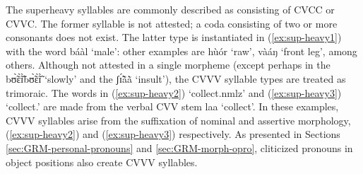The superheavy syllables are commonly described as consisting of CVCC or CVVC.
The former syllable is not attested; a coda consisting of two or more consonants
does not exist. The latter type is instantiated in (\ref{ex:sup-heavy1}) with
 the word {\sls báàl} `male':  other examples are {\sls hùór} `raw',  
{\sls vàáŋ} `front leg', among others.  Although not attested in a single
morpheme (except perhaps in the  {\sls  bʊ̃̀ɛ̃̀ɪ̃̀bʊ̃̀ɛ̃̀ɪ̃̀} `slowly' 
and the  {\sls ʃɪ̃́ã̀ã̀} `insult'),    the CVVV syllable types are 
treated as trimoraic. The words in
(\ref{ex:sup-heavy2}) `collect.{\sc nmlz}'  and  (\ref{ex:sup-heavy3}) 
`collect.{\foc}'
are made from the verbal CVV stem {\sls laa} `collect'. In these examples,  
CVVV 
syllables
arise  from the suffixation of nominal 
and assertive  morphology, 
(\ref{ex:sup-heavy2}) and (\ref{ex:sup-heavy3}) respectively. As presented in 
Sections
\ref{sec:GRM-personal-pronouns} and \ref{sec:GRM-morph-opro}, cliticized
pronouns in object positions also
create CVVV syllables.



